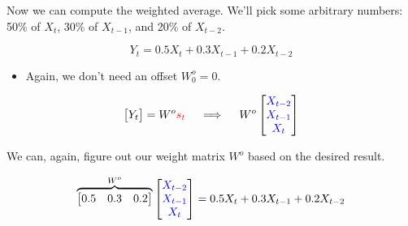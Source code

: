         \subsecdiv

        Now we can compute the weighted average. We'll pick some arbitrary numbers: 50\% of $X_t$, 30\% of $X_{t-1}$, and 20\% of $X_{t-2}$.

        \begin{equation}
            Y_t = 0.5X_t + 0.3X_{t-1} + 0.2X_{t-2}
        \end{equation}

        \begin{itemize}
            \item Again, we don't need an offset $W_0^o=0$.
        \end{itemize}

        \begin{equation}
            \begin{bmatrix}
                Y_t
            \end{bmatrix} = W^o\textcolor{red}{s_t}
            \quad \implies \quad
            W^o 
            \begin{bmatrix}
                \textcolor{blue}{X_{t-2}} \\ \textcolor{blue}{X_{t-1}} \\ \textcolor{blue}{X_{t}}
            \end{bmatrix} 
        \end{equation}

        We can, again, figure out our weight matrix $W^o$ based on the desired result.

        \begin{equation*}
            \overbrace{
                \begin{bmatrix}
                    0.5 & 0.3 & 0.2
                \end{bmatrix}
            }^{W^o}
            \begin{bmatrix}
                \textcolor{blue}{X_{t-2}} \\ \textcolor{blue}{X_{t-1}} \\ \textcolor{blue}{X_{t}}
            \end{bmatrix} 
            =
            0.5X_t + 0.3X_{t-1} + 0.2X_{t-2}
        \end{equation*}

